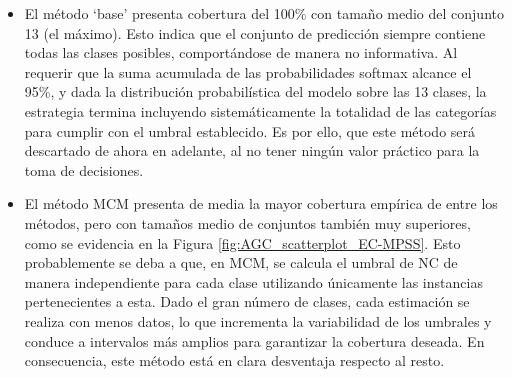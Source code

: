 \begin{itemize}

    \item El método `base' presenta cobertura del 100\% con tamaño medio del conjunto 13 (el máximo). Esto indica que el conjunto de predicción siempre contiene todas las clases posibles, comportándose de manera no informativa. Al requerir que la suma acumulada de las probabilidades softmax alcance el 95\%, y dada la distribución probabilística del modelo sobre las 13 clases, la estrategia termina incluyendo sistemáticamente la totalidad de las categorías para cumplir con el umbral establecido. Es por ello, que este método será descartado de ahora en adelante, al no tener ningún valor práctico para la toma de decisiones.
    
    \item El método MCM presenta de media la mayor cobertura empírica de entre los métodos, pero con tamaños medio de conjuntos también muy superiores, como se evidencia en la Figura \ref{fig:AGC_scatterplot_EC-MPSS}. Esto probablemente se deba a que, en MCM, se calcula el umbral de \acrshort{NC} de manera independiente para cada clase utilizando únicamente las instancias pertenecientes a esta. Dado el gran número de clases, cada estimación se realiza con menos datos, lo que incrementa la variabilidad de los umbrales y conduce a intervalos más amplios para garantizar la cobertura deseada. En consecuencia, este método está en clara desventaja respecto al resto. 

\end{itemize}

